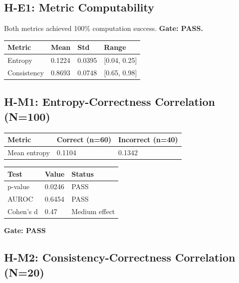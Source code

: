 \subsection{H-E1: Metric Computability}

Both metrics achieved 100\% computation success. \textbf{Gate: PASS.}

\begin{table}[h]
\centering
\begin{tabular}{llll}
\toprule
\textbf{Metric} & \textbf{Mean} & \textbf{Std} & \textbf{Range} \\
\midrule
Entropy & 0.1224 & 0.0395 & [0.04, 0.25] \\
Consistency & 0.8693 & 0.0748 & [0.65, 0.98] \\
\bottomrule
\end{tabular}
\end{table}

\subsection{H-M1: Entropy-Correctness Correlation (N=100)}

\begin{table}[h]
\centering
\begin{tabular}{lll}
\toprule
\textbf{Metric} & \textbf{Correct (n=60)} & \textbf{Incorrect (n=40)} \\
\midrule
Mean entropy & 0.1104 & 0.1342 \\
\bottomrule
\end{tabular}
\end{table}

\begin{table}[h]
\centering
\begin{tabular}{lll}
\toprule
\textbf{Test} & \textbf{Value} & \textbf{Status} \\
\midrule
p-value & 0.0246 & PASS \\
AUROC & 0.6454 & PASS \\
Cohen's d & 0.47 & Medium effect \\
\bottomrule
\end{tabular}
\end{table}

\textbf{Gate: PASS}

\subsection{H-M2: Consistency-Correctness Correlation (N=20)}

